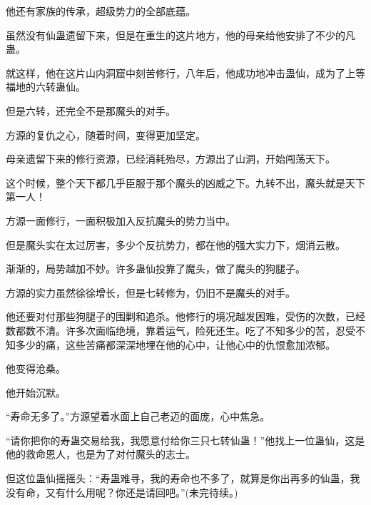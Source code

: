 \begin{this_body}
他还有家族的传承，超级势力的全部底蕴。

虽然没有仙蛊遗留下来，但是在重生的这片地方，他的母亲给他安排了不少的凡蛊。

就这样，他在这片山内洞窟中刻苦修行，八年后，他成功地冲击蛊仙，成为了上等福地的六转蛊仙。

但是六转，还完全不是那魔头的对手。

方源的复仇之心，随着时间，变得更加坚定。

母亲遗留下来的修行资源，已经消耗殆尽，方源出了山洞，开始闯荡天下。

这个时候，整个天下都几乎臣服于那个魔头的凶威之下。九转不出，魔头就是天下第一人！

方源一面修行，一面积极加入反抗魔头的势力当中。

但是魔头实在太过厉害，多少个反抗势力，都在他的强大实力下，烟消云散。

渐渐的，局势越加不妙。许多蛊仙投靠了魔头，做了魔头的狗腿子。

方源的实力虽然徐徐增长，但是七转修为，仍旧不是魔头的对手。

他还要对付那些狗腿子的围剿和追杀。他修行的境况越发困难，受伤的次数，已经数都数不清。许多次面临绝境，靠着运气，险死还生。吃了不知多少的苦，忍受不知多少的痛，这些苦痛都深深地埋在他的心中，让他心中的仇恨愈加浓郁。

他变得沧桑。

他开始沉默。

“寿命无多了。”方源望着水面上自己老迈的面庞，心中焦急。

“请你把你的寿蛊交易给我，我愿意付给你三只七转仙蛊！”他找上一位蛊仙，这是他的救命恩人，也是为了对付魔头的志士。

但这位蛊仙摇摇头：“寿蛊难寻，我的寿命也不多了，就算是你出再多的仙蛊，我没有命，又有什么用呢？你还是请回吧。”(未完待续。)

\end{this_body}

